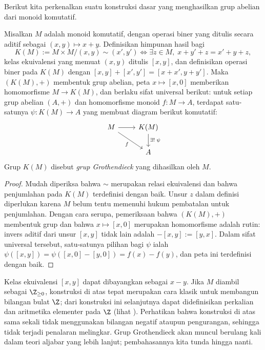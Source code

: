 Berikut kita perkenalkan suatu konstruksi dasar yang menghasilkan grup abelian dari monoid komutatif.
\begin{definition-theorem}\label{def:K-group}
	Misalkan $M$ adalah monoid komutatif, dengan operasi biner yang ditulis secara aditif sebagai $(x,y) \mapsto x+y$. Definisikan himpunan hasil bagi
	\[ K(M) := M \times M \bigg/ (x,y) \sim (x',y') \iff \exists z \in M,\; x+y'+z=x'+y+z, \]
	kelas ekuivalensi yang memuat $(x,y)$ ditulis $[x,y]$, dan definisikan operasi biner pada $K(M)$ dengan $[x,y] + [x',y'] = [x+x',y+y']$. Maka $(K(M),+)$ membentuk grup abelian, peta $x \mapsto [x,0]$ memberikan homomorfisme $M \to K(M)$, dan berlaku sifat universal berikut: untuk setiap grup abelian $(A,+)$ dan homomorfisme monoid $f: M \to A$, terdapat satu-satunya $\psi: K(M) \to A$ yang membuat diagram berikut komutatif:
	\[ \begin{tikzcd}
		M \arrow[r] \arrow[rd, "f"'] & K(M) \arrow[d, "\exists!\;\psi"] \\
		& A
	\end{tikzcd}\]
	Grup $K(M)$ disebut \emph{grup Grothendieck} yang dihasilkan oleh $M$.
\end{definition-theorem}
\begin{proof}
	Mudah diperiksa bahwa $\sim$ merupakan relasi ekuivalensi dan bahwa penjumlahan pada $K(M)$ terdefinisi dengan baik. Unsur $z$ dalam definisi diperlukan karena $M$ belum tentu memenuhi hukum pembatalan untuk penjumlahan. Dengan cara serupa, pemeriksaan bahwa $(K(M), +)$ membentuk grup dan bahwa $x \mapsto [x,0]$ merupakan homomorfisme adalah rutin: invers aditif dari unsur $[x,y]$ tidak lain adalah $-[x,y] := [y,x]$. Dalam sifat universal tersebut, satu-satunya pilihan bagi $\psi$ ialah $\psi([x,y]) = \psi([x,0]-[y,0]) = f(x)-f(y)$, dan peta ini terdefinisi dengan baik.
\end{proof}
Kelas ekuivalensi $[x,y]$ dapat dibayangkan sebagai $x-y$. Jika $M$ diambil sebagai $\Z_{\geq 0}$, konstruksi di atas tepat merupakan cara klasik untuk membangun bilangan bulat $\Z$; dari konstruksi ini selanjutnya dapat didefinisikan perkalian dan aritmetika elementer pada $\Z$ (lihat \cite[Bab nol, \S 3]{DN00}). Perhatikan bahwa konstruksi di atas sama sekali tidak menggunakan bilangan negatif ataupun pengurangan, sehingga tidak terjadi penalaran melingkar. Grup Grothendieck akan muncul berulang kali dalam teori aljabar yang lebih lanjut; pembahasannya kita tunda hingga nanti.

